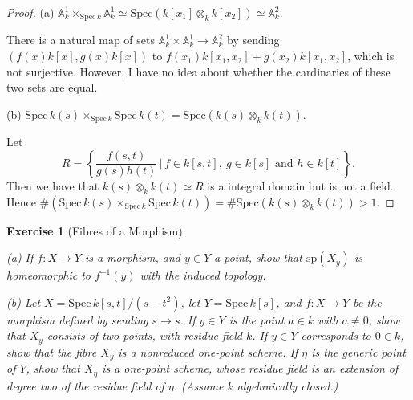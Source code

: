 \documentclass{amsart}
\newtheorem{exe}{Exercise}[subsection]
\theoremstyle{remark}\newtheorem{rmk}[theorem]{Remark}
\begin{document}
\begin{proof}
	(a) $\mathbb{A}_k^1 \times_{\mathrm{Spec}\, k} \mathbb{A}_k^1\simeq \mathrm{Spec}(k[x_1]\otimes_k k[x_2])\simeq \mathbb{A}_k^2$.
	
	There is a natural map of sets $\mathbb{A}_k^1\times\mathbb{A}_k^1\to\mathbb{A}_k^2$ by sending $(f(x)k[x],g(x)k[x])$ to $f(x_1)k[x_1,x_2]+g(x_2)k[x_1,x_2]$, which is not surjective. However, I have no idea about whether the cardinaries of these two sets are equal.
	
	(b) $\mathrm{Spec}\, k(s)\times_{\mathrm{Spec}\, k}\mathrm{Spec}\, k(t)=\mathrm{Spec} (k(s)\otimes _k k(t))$.
	
	Let $$R=\left\{\frac{f(s,t)}{g(s)h(t)}\,\Bigg|\,f\in k[s,t],\ g\in k[s]\text{ and }h\in k[t]\right\}.$$Then we have that $k(s)\otimes_k k(t)\simeq R$ is a integral domain but is not a field. Hence $\#(\mathrm{Spec}\, k(s)\times_{\mathrm{Spec}\, k}\mathrm{Spec}\, k(t))=\#\mathrm{Spec} (k(s)\otimes _k k(t))>1$.
\end{proof}

\begin{exe}[Fibres of a Morphism]
	\ 
	
	(a) If $f: X\rightarrow Y$ is a morphism, and $y\in Y$ a point, show that $\mathrm{sp}(X_y)$ is homeomorphic to $f^{-1}(y)$
	with the induced topology.
	
	(b) Let $X=\mathrm{Spec}\,k[s,t]/(s-t^2)$, let $Y=\mathrm{Spec}\,k[s]$, and $f:X\to Y$ be the morphism defined by sending $s\to s$. If $y\in Y$ is the point $a\in k$ with $a\neq0$, show that $X_y$ consists of two points, with residue field $k$. If $y\in Y$ corresponds to $0\in k$, show that the fibre $X_y$ is a nonreduced one-point scheme. If $\eta$ is the generic point of $Y$, show that $X_\eta$ is a one-point scheme, whose residue field is an extension of degree two of the residue field of $\eta$. (Assume $k$ algebraically closed.)
\end{exe}
\end{document}
